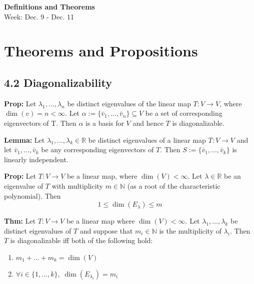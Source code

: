 \noindent
\textbf{\LARGE Definitions and Theorems} \\
\large Week: Dec. 9 - Dec. 11

\normalsize

\section*{Theorems and Propositions}

\subsection*{4.2 Diagonalizability}

\textbf{Prop:} Let $\lambda_1, \ldots , \lambda_n$ be distinct eigenvalues of the linear map $T: V \rightarrow V$, where $\dim(v) = n < \infty$. Let $\alpha := \{\bar v_1, \ldots , \bar v_n \} \subseteq V$ be a set of corresponding eigenvectors of T. Then $\alpha$ is a basis for $V$ and hence $T$ is diagonalizable.

\bigskip 

\noindent 
\textbf{Lemma:} Let $\lambda_1, \ldots , \lambda_k \in \mathbb{R}$ be distinct eigenvalues of a linear map $T: V \rightarrow V$ and let $\bar v_1, \ldots , \bar v_k$ be any corresponding eigenvectors of $T$. Then $S := \{\bar v_1, \ldots , \bar v_k \}$ is linearly independent. 

\bigskip 

\noindent 
\textbf{Prop:} Let $T: V \rightarrow V$ be a linear map, where $\dim(V) < \infty$. Let $\lambda \in \mathbb{R}$ be an eigenvalue of $T$ with multiplicity $m \in \mathbb{N}$ (as a root of the characteristic polynomial). Then 
\[1 \le \dim(E_\lambda) \le m\] 

\bigskip 

\noindent 
\textbf{Thm:} Let $T: V \rightarrow V$ be a linear map where $\dim(V) < \infty$. Let $\lambda_1, \ldots , \lambda_k$ be distinct eigenvalues of $T$ and suppose that $m_i \in \mathbb{N}$ is the multiplicity of $\lambda_i$. Then $T$ is diagonalizable iff both of the following hold:
\begin{enumerate}
    \item $m_1 + \ldots + m_k = \dim(V)$
    \item $\forall i \in \{1, \ldots , k\},\; \dim(E_{\lambda_i}) = m_i$
\end{enumerate}
